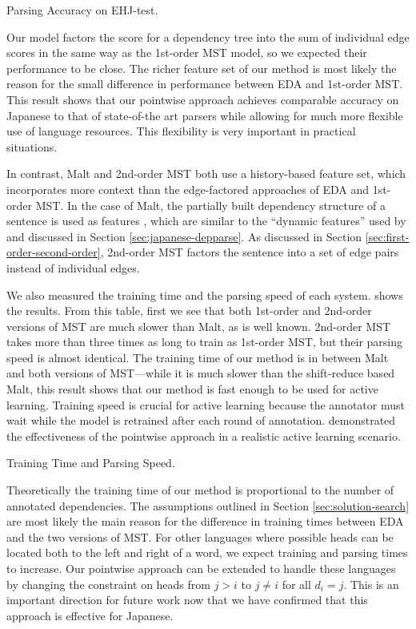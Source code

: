 \documentclass[english]{jnlp_1.4}
\def\tabref#1{}
\begin{document}
\begin{table}[b]
  \caption{Parsing Accuracy on EHJ-test.}
  \label{table:result-EHJ}

\end{table}

Our model factors the score for a dependency tree into the sum of individual edge scores in the same
way as the 1st-order MST model, so we expected their performance to be close. The richer feature set
of our method is most likely the reason for the small difference in performance between EDA and
1st-order MST. This result shows that our pointwise approach achieves comparable accuracy on
Japanese to that of state-of-the art parsers while allowing for much more flexible use of language
resources. This flexibility is very important in practical situations.

In contrast, Malt and 2nd-order MST both use a history-based feature set, which incorporates more
context than the edge-factored approaches of EDA and 1st-order MST. In the case of Malt, the
partially built dependency structure of a sentence is used as features \cite{nivre2006maltparser},
which are similar to the ``dynamic features'' used by  and discussed in Section
\ref{sec:japanese-depparse}. As discussed in Section \ref{sec:first-order-second-order}, 2nd-order
MST factors the sentence into a set of edge pairs instead of individual edges.

We also measured the training time and the parsing speed of each system. \tabref{table:learning}
shows the results. From this table, first we see that both 1st-order and 2nd-order versions of MST
are much slower than Malt, as is well known. 2nd-order MST takes more than three times as long to train
as 1st-order MST, but their parsing speed is almost identical. The training time of our method is in
between Malt and both versions of MST---while it is much slower than the shift-reduce based Malt,
this result shows that our method is fast enough to be used for active learning. Training speed is
crucial for active learning because the annotator must wait while the model is retrained after each
round of annotation.  demonstrated the effectiveness of the pointwise
approach in a realistic active learning scenario.

\begin{table}[b]
  \caption{Training Time and Parsing Speed.}
  \label{table:learning}

\end{table}

Theoretically the training time of our method is proportional to the number of annotated
dependencies. The assumptions outlined in Section \ref{sec:solution-search} are most likely the main
reason for the difference in training times between EDA and the two versions of MST. For other
languages where possible heads can be located both to the left and right of a word, we expect
training and parsing times to increase. Our pointwise approach can be extended to handle these
languages by changing the constraint on heads from $j>i$ to $j \ne i$ for all $d_i=j$. This is an
important direction for future work now that we have confirmed that this approach is effective for
Japanese.
\end{document}
